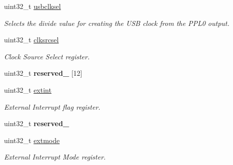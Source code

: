 \begin{DoxyCompactItemize}
\mbox{\label{structlpc176x__scb_a41fbdc91942699c322d5f49f68a04abd}} 
uint32\+\_\+t \mbox{\hyperlink{structlpc176x__scb_a41fbdc91942699c322d5f49f68a04abd}{usbclksel}}
\begin{DoxyCompactList}\small\item\em Selects the divide value for creating the U\+SB clock from the P\+P\+L0 output. \end{DoxyCompactList}\item 
\mbox{\label{structlpc176x__scb_a27b97aac8db122b91c993984ee89e146}} 
uint32\+\_\+t \mbox{\hyperlink{structlpc176x__scb_a27b97aac8db122b91c993984ee89e146}{clksrcsel}}
\begin{DoxyCompactList}\small\item\em Clock Source Select register. \end{DoxyCompactList}\item 
\mbox{\label{structlpc176x__scb_af97bb89055f4e3f2ac19982df8443994}} 
uint32\+\_\+t {\bfseries reserved\+\_} \mbox{[}12\mbox{]}
\item 
\mbox{\label{structlpc176x__scb_a165597bde461f65d4fcad0c3ecc5b8be}} 
uint32\+\_\+t \mbox{\hyperlink{structlpc176x__scb_a165597bde461f65d4fcad0c3ecc5b8be}{extint}}
\begin{DoxyCompactList}\small\item\em External Interrupt flag register. \end{DoxyCompactList}\item 
\mbox{\label{structlpc176x__scb_a68d1fbc7d27c16ccef9103aeea2d3547}} 
uint32\+\_\+t {\bfseries reserved\+\_}
\item 
\mbox{\label{structlpc176x__scb_a4eb6ed5fdc390919a96544a99b22fe99}} 
uint32\+\_\+t \mbox{\hyperlink{structlpc176x__scb_a4eb6ed5fdc390919a96544a99b22fe99}{extmode}}
\begin{DoxyCompactList}\small\item\em External Interrupt Mode register. \end{DoxyCompactList}\item 
\mbox{\label{structlpc176x__scb_ada4622f8ba57c18e49606b037db514ed}} 

\end{DoxyCompactItemize}
